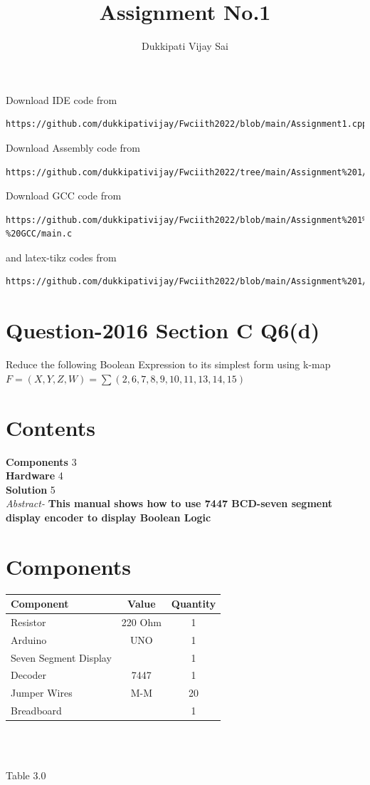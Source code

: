 \documentclass[journal,12pt,twocolumn]{IEEEtran}
\begin{document}
\title{Assignment No.1}

\author{Dukkipati Vijay Sai}
\maketitle
\newpage
\bigskip
\renewcommand{\thefigure}{\theenumi}
\renewcommand{\thetable}{\theenumi}


Download IDE code from 
\begin{lstlisting}
https://github.com/dukkipativijay/Fwciith2022/blob/main/Assignment1.cpp
\end{lstlisting}
Download Assembly code from
\begin{lstlisting}
https://github.com/dukkipativijay/Fwciith2022/tree/main/Assignment%201/Codes/asm
\end{lstlisting}
Download GCC code from
\begin{lstlisting}
https://github.com/dukkipativijay/Fwciith2022/blob/main/Assignment%201%20-%20GCC/main.c
\end{lstlisting}
%
and latex-tikz codes from 
%
\begin{lstlisting}
https://github.com/dukkipativijay/Fwciith2022/blob/main/Assignment%201/Latex%20File.tex
\end{lstlisting}
%
\section{Question-2016 Section C Q6(d)}

Reduce the following Boolean Expression to its simplest form using k-map
$F=(X,Y,Z,W)= \sum(2,6,7,8,9,10,11,13,14,15)$
\section{Contents}
\raggedright
\textbf{Components}
\hspace{10em} 3
\\\textbf{Hardware}
\hspace{11em} 4
\\\textbf{Solution}
\hspace{11.8em}   5\\
\textit{Abstract-}
\textbf{This manual shows how to use 7447 BCD-seven segment display encoder to display Boolean Logic}
\section{Components}
\centering
\begin{tabular}{|l|c|c|}
\hline
Component & Value & Quantity\\
\hline
Resistor & 220 Ohm & 1\\
\hline
Arduino & UNO & 1\\
\hline
Seven Segment Display & & 1\\
\hline
Decoder & 7447 & 1\\
\hline
Jumper Wires & M-M & 20\\
\hline
Breadboard & & 1\\
\hline
\end{tabular}\\
\
\centerline{Table 3.0}
\end{document}
